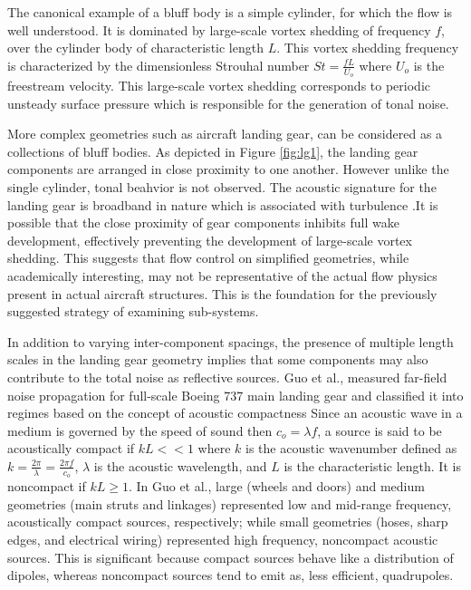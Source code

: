 The canonical example of a bluff body is a simple cylinder, for which the flow is well understood. It is dominated by large-scale vortex shedding of frequency $f$, over the cylinder body of characteristic length $L$. This vortex shedding frequency is characterized by the dimensionless Strouhal number $St = \frac{fL}{U_o}$ where $U_o $ is the freestream velocity. This large-scale vortex shedding corresponds to periodic unsteady surface pressure which is responsible for the generation of tonal noise. 
    
More complex geometries such as aircraft landing gear, can be considered as a collections of bluff bodies. As depicted in Figure \ref{fig:lg1}, the landing gear components are arranged in close proximity to one another. However unlike the single cylinder, tonal beahvior is not observed. The acoustic signature for the landing gear is broadband in nature which is associated with turbulence \cite{zawodny2009}.It is possible that the close proximity of gear components inhibits full wake development, effectively preventing the development of large-scale vortex shedding. This suggests that flow control on simplified geometries, while academically interesting, may not be representative of the actual flow physics present in actual aircraft structures. This is the foundation for the previously suggested strategy of examining sub-systems. 

In addition to varying inter-component spacings, the presence of multiple length scales in the landing gear geometry implies that some components may also contribute to the total noise as reflective sources. Guo et al., measured far-field noise propagation for full-scale Boeing 737 main landing gear and classified it into regimes based on the concept of acoustic compactness \cite{guo2006} Since an acoustic wave in a medium is governed by the speed of sound then $c_o = \lambda f$, a source is said to be acoustically compact if $kL << 1$ where $k$ is the acoustic wavenumber defined as $k = \frac{2 \pi}{\lambda} = \frac{2 \pi f}{c_o}$, $\lambda$ is the acoustic wavelength, and $L$ is the characteristic length. It is noncompact if $kL \geq 1$. In Guo et al., large (wheels and doors) and medium geometries (main struts and linkages) represented low and mid-range frequency, acoustically compact sources, respectively; while small geometries (hoses, sharp edges, and electrical wiring) represented high frequency, noncompact acoustic sources. This is significant because compact sources behave like a distribution of dipoles, whereas noncompact sources tend to emit as, less efficient, quadrupoles. 

